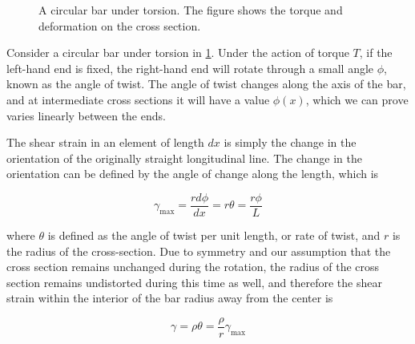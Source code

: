 \documentclass[
10pt,
a4paper,
openany,
svgnames,
]{book}
\begin{document}
\begin{figure}[h]
  \centering
  \caption[A circular bar under torsion]{A circular bar under torsion. The figure shows the torque and deformation on the cross section.}
  \label{fig: 3d torsional deformation}
\end{figure}

Consider a circular bar under torsion in \cref{fig: 3d torsional deformation}. Under the action of torque $T$, if the left-hand end is fixed, the right-hand end will rotate through a small angle $\phi$, known as the angle of twist. The angle of twist changes along the axis of the bar, and at intermediate cross sections it will have a value $\phi(x)$, which we can prove varies linearly between the ends.

The shear strain in an element of length $dx$ is simply the change in the orientation of the originally straight longitudinal line. The change in the orientation can be defined by the angle of change along the length, which is

\begin{equation} \label{eqn: strain and angle of twist}
  \gamma _{\max } = \frac{rd\phi }{dx} = r\theta  = \frac{r\phi }{L}
\end{equation}

where $\theta$ is defined as the angle of twist per unit length, or rate of twist, and $r$ is the radius of the cross-section. Due to symmetry and our assumption that the cross section remains unchanged during the rotation, the radius of the cross section remains undistorted during this time as well, and therefore the shear strain within the interior of the bar radius away from the center is

\begin{equation} \label{eqn: strain and radius}
  \gamma  = \rho \theta  = \frac{\rho }{r}\gamma _{\max }
\end{equation}
\end{document}
